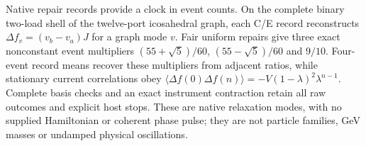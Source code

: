 Native repair records provide a clock in event counts. On the complete
binary two-load shell of the twelve-port icosahedral graph, each C/E record
reconstructs $\Delta f_v=(v_b-v_a)J$ for a graph mode $v$. Fair uniform repairs
give three exact nonconstant event multipliers
$(55+\sqrt5)/60$, $(55-\sqrt5)/60$ and $9/10$. Four-event record means recover
these multipliers from adjacent ratios, while stationary current correlations
obey $\langle\Delta f(0)\Delta f(n)\rangle=-V(1-\lambda)^2\lambda^{n-1}$.
Complete basis checks and an exact instrument contraction retain all raw
outcomes and explicit host stops. These are native relaxation modes, with no
supplied Hamiltonian or coherent phase pulse; they are not particle families,
GeV masses or undamped physical oscillations.
